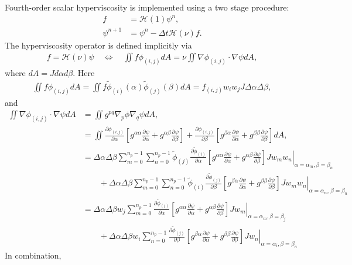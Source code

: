 \documentclass{article}
\newcommand{\pdiff}[2]{\frac{\partial #1}{\partial #2}}
\begin{document}
Fourth-order scalar hyperviscosity is implemented using a two stage procedure:
\begin{align}
f &= \mathcal{H}(1) \psi^n, \\
\psi^{n+1} &= \psi^n - \Delta t \mathcal{H}(\nu) f.
\end{align}  The hyperviscosity operator is defined implicitly via
\begin{align}
f = \mathcal{H}(\nu) \psi \quad \Longleftrightarrow \quad \iint f \phi_{(i,j)} dA = \nu \iint \nabla \phi_{(i,j)} \cdot \nabla \psi dA,
\end{align} where $dA = J d\alpha d\beta$.  Here
\begin{align}
\iint f \phi_{(i,j)} dA = \iint f \tilde{\phi}_{(i)}(\alpha) \tilde{\phi}_{(j)}(\beta) dA = f_{(i,j)} w_i w_j J \Delta \alpha \Delta \beta,
\end{align} and
\begin{align}
\iint \nabla \phi_{(i,j)} \cdot \nabla \psi dA &= \iint g^{pq} \nabla_p \phi \nabla_q \psi dA, \\
&= \iint \pdiff{\phi_{(i,j)}}{\alpha} \left[ g^{\alpha \alpha} \pdiff{\psi}{\alpha} + g^{\alpha \beta} \pdiff{\psi}{\beta} \right] + \pdiff{\phi_{(i,j)}}{\beta} \left[ g^{\beta \alpha} \pdiff{\psi}{\alpha} + g^{\beta \beta} \pdiff{\psi}{\beta} \right] dA, \\
&= \Delta \alpha \Delta \beta \sum_{m=0}^{n_p-1} \sum_{n=0}^{n_p-1} \tilde{\phi}_{(j)} \pdiff{\tilde{\phi}_{(i)}}{\alpha} \left. \left[ g^{\alpha \alpha} \pdiff{\psi}{\alpha} + g^{\alpha \beta} \pdiff{\psi}{\beta} \right] J w_m w_n \right\vert_{\alpha = \alpha_m, \beta = \beta_n} \nonumber \\
& \qquad + \Delta \alpha \Delta \beta \sum_{m=0}^{n_p-1} \sum_{n=0}^{n_p-1} \tilde{\phi}_{(i)} \pdiff{\tilde{\phi}_{(j)}}{\beta} \left. \left[ g^{\beta \alpha} \pdiff{\psi}{\alpha} + g^{\beta \beta} \pdiff{\psi}{\beta} \right] J w_m w_n \right\vert_{\alpha = \alpha_m, \beta = \beta_n} \\
&= \Delta \alpha \Delta \beta w_j \sum_{m=0}^{n_p-1} \pdiff{\tilde{\phi}_{(i)}}{\alpha} \left. \left[ g^{\alpha \alpha} \pdiff{\psi}{\alpha} + g^{\alpha \beta} \pdiff{\psi}{\beta} \right] J w_m \right\vert_{\alpha = \alpha_m, \beta = \beta_j} \nonumber \\
& \qquad + \Delta \alpha \Delta \beta w_i \sum_{n=0}^{n_p-1} \pdiff{\tilde{\phi}_{(j)}}{\beta} \left. \left[ g^{\beta \alpha} \pdiff{\psi}{\alpha} + g^{\beta \beta} \pdiff{\psi}{\beta} \right] J w_n \right\vert_{\alpha = \alpha_i, \beta = \beta_n}
\end{align}  In combination,
\end{document}

